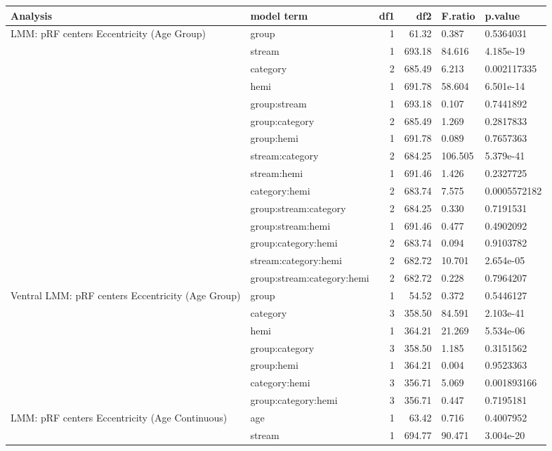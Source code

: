 \begin{table}
\centering
\begin{tabular}{llrrll}
\toprule
Analysis & model term & df1 & df2 & F.ratio & p.value\\
\midrule
LMM: pRF centers Eccentricity (Age Group) & group & 1 & 61.32 & 0.387 & 0.5364031\\
 & stream & 1 & 693.18 & 84.616 & 4.185e-19\\
 & category & 2 & 685.49 & 6.213 & 0.002117335\\
 & hemi & 1 & 691.78 & 58.604 & 6.501e-14\\
 & group:stream & 1 & 693.18 & 0.107 & 0.7441892\\
\addlinespace
 & group:category & 2 & 685.49 & 1.269 & 0.2817833\\
 & group:hemi & 1 & 691.78 & 0.089 & 0.7657363\\
 & stream:category & 2 & 684.25 & 106.505 & 5.379e-41\\
 & stream:hemi & 1 & 691.46 & 1.426 & 0.2327725\\
 & category:hemi & 2 & 683.74 & 7.575 & 0.0005572182\\
\addlinespace
 & group:stream:category & 2 & 684.25 & 0.330 & 0.7191531\\
 & group:stream:hemi & 1 & 691.46 & 0.477 & 0.4902092\\
 & group:category:hemi & 2 & 683.74 & 0.094 & 0.9103782\\
 & stream:category:hemi & 2 & 682.72 & 10.701 & 2.654e-05\\
 & group:stream:category:hemi & 2 & 682.72 & 0.228 & 0.7964207\\
\addlinespace
Ventral LMM: pRF centers Eccentricity (Age Group) & group & 1 & 54.52 & 0.372 & 0.5446127\\
 & category & 3 & 358.50 & 84.591 & 2.103e-41\\
 & hemi & 1 & 364.21 & 21.269 & 5.534e-06\\
 & group:category & 3 & 358.50 & 1.185 & 0.3151562\\
 & group:hemi & 1 & 364.21 & 0.004 & 0.9523363\\
\addlinespace
 & category:hemi & 3 & 356.71 & 5.069 & 0.001893166\\
 & group:category:hemi & 3 & 356.71 & 0.447 & 0.7195181\\
LMM: pRF centers Eccentricity (Age Continuous) & age & 1 & 63.42 & 0.716 & 0.4007952\\
 & stream & 1 & 694.77 & 90.471 & 3.004e-20\\

\end{tabular}
\end{table}
